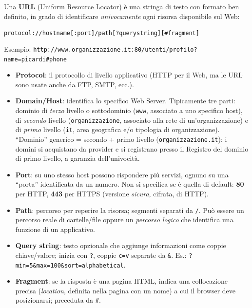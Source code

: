 \begin{definizione}[URL]
Una \textbf{URL} (Uniform Resource Locator) \`e una stringa di testo con formato ben definito,
in grado di identificare \emph{univocamente} ogni risorsa disponibile sul Web:
\begin{center}
\texttt{protocol://hostname[:port]/path[?querystring][\#fragment]}
\end{center}
Esempio: \texttt{http://www.organizzazione.it:80/utenti/profilo?name=picardi\#phone}
\end{definizione}

\begin{itemize}
  \item \textbf{Protocol}: il protocollo di livello applicativo (HTTP per il Web, ma le URL
        sono usate anche da FTP, SMTP, ecc.).
  \item \textbf{Domain/Host}: identifica lo specifico Web Server. Tipicamente tre parti:
        dominio di \emph{terzo} livello o sottodominio (\texttt{www}, associato a uno specifico host),
        di \emph{secondo} livello (\texttt{organizzazione}, associato alla rete di
        un'organizzazione) e di \emph{primo} livello (\texttt{it}, area geografica e/o tipologia
        di organizzazione). ``Dominio'' generico = secondo + primo livello
        (\texttt{organizzazione.it}); i domini si acquistano da provider e si registrano presso
        il Registro del dominio di primo livello, a garanzia dell'univocit\`a.
  \item \textbf{Port}: su uno stesso host possono rispondere pi\`u servizi, ognuno su una
        ``porta'' identificata da un numero. Non si specifica se \`e quella di default:
        \textbf{80} per HTTP, \textbf{443} per HTTPS (versione \emph{sicura}, cifrata, di HTTP).
  \item \textbf{Path}: percorso per reperire la risorsa; segmenti separati da \texttt{/}. Pu\`o
        essere un percorso reale di cartelle/file oppure un \emph{percorso logico} che identifica
        una funzione di un applicativo.
  \item \textbf{Query string}: testo opzionale che aggiunge informazioni come coppie
        chiave/valore; inizia con \texttt{?}, coppie \texttt{c=v} separate da \texttt{\&}.
        Es.: \texttt{?min=5\&max=100\&sort=alphabetical}.
  \item \textbf{Fragment}: se la risposta \`e una pagina HTML, indica una collocazione precisa
        (\emph{location}, definita nella pagina con un nome) a cui il browser deve posizionarsi;
        preceduta da \texttt{\#}.
\end{itemize}

